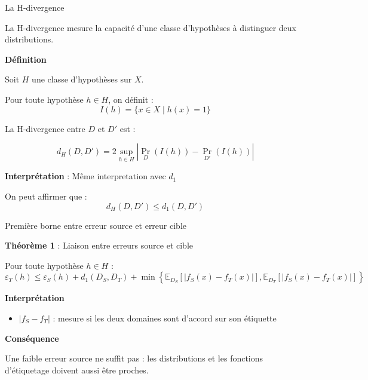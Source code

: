 \documentclass[11pt]{beamer}
\begin{document}
\begin{frame}{La H-divergence}

La H-divergence mesure la capacité d’une classe
d’hypothèses à distinguer deux distributions.

\vspace{0.2cm}

\textbf{Définition}

Soit $H$ une classe d’hypothèses sur $X$.

Pour toute hypothèse $h \in H$, on définit :
\[
I(h)=\{x \in X \mid h(x)=1\}
\]

La H-divergence entre $D$ et $D'$ est :

\[
d_H(D,D')
=
2
\sup_{h \in H}
\left|
\Pr_D(I(h))
-
\Pr_{D'}(I(h))
\right|
\]

\vspace{0.2cm}

\textbf{Interprétation} : 
Même interpretation avec $d_1$

\vspace{0.3cm}

On peut affirmer que : 
\[
d_H(D,D')
\leq
d_1(D,D')
\]

\end{frame}


\begin{frame}{Première borne entre erreur source et erreur cible}

\textbf{Théorème 1} : Liaison entre erreurs source et cible

\vspace{0.2cm}

Pour toute hypothèse $h \in H$ :
\[
\varepsilon_T(h)
\leq
\varepsilon_S(h)
+
d_1(D_S,D_T)
+
\min
\left\{
\mathbb{E}_{D_S}[|f_S(x)-f_T(x)|],
\mathbb{E}_{D_T}[|f_S(x)-f_T(x)|]
\right\}
\]

\vspace{0.4cm}

\textbf{Interprétation}

\begin{itemize}
    
    \item $|f_S-f_T|$ :
    mesure si les deux domaines sont d'accord sur son étiquette
\end{itemize}

\vspace{0.4cm}

\textbf{Conséquence}

Une faible erreur source ne suffit pas :
les distributions et les fonctions d’étiquetage
doivent aussi être proches.

\end{frame}
\end{document}
